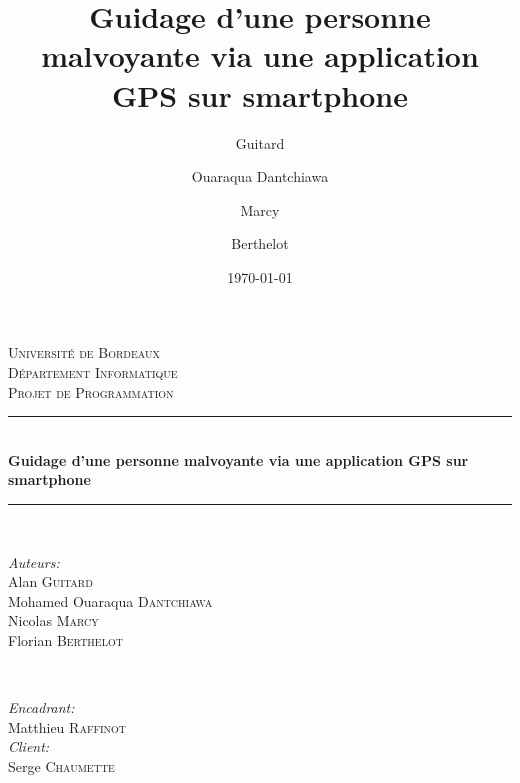 \documentclass[12pt]{report}
\title{Guidage d'une personne malvoyante via une application GPS sur smartphone}
\author{Guitard \and Ouaraqua Dantchiawa \and Marcy \and Berthelot}
\date{\today}
\begin{document}
\setcounter{secnumdepth}{3}
\begin{titlepage}

\newcommand{\HRule}{\rule{\linewidth}{0.5mm}} 

\center 

\textsc{\LARGE Université de Bordeaux}\\[1.5cm] 
\textsc{\Large Département Informatique}\\[0.5cm] 
\textsc{\large Projet de Programmation}\\[0.5cm] 


\HRule \\[0.5cm]
{ \LARGE \bfseries Guidage d’une personne malvoyante via une application GPS sur smartphone}\\[0.5cm]
\HRule \\[1.5cm]
 

\begin{minipage}{0.4\textwidth}
\begin{flushleft} \large
\emph{Auteurs:}\\
Alan \textsc{Guitard}\\
Mohamed Ouaraqua \textsc{ Dantchiawa}\\
Nicolas \textsc{Marcy}\\
Florian \textsc{Berthelot}\\

\end{flushleft}
\end{minipage}
~
\begin{minipage}{0.4\textwidth}
\begin{flushright} \large
\emph{Encadrant:} \\
Matthieu \textsc{Raffinot}\\
\emph{Client:}\\
Serge \textsc{Chaumette} 
\end{flushright}
\end{minipage}\\[2cm]





\end{titlepage}
\end{document}

